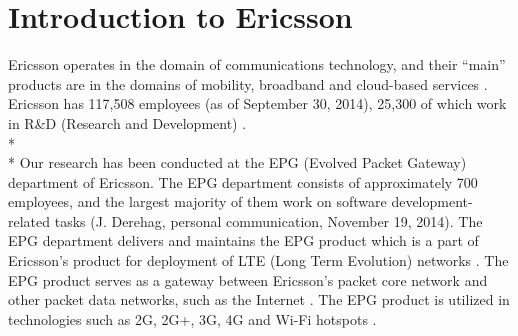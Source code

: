 \documentclass[final_report_innit.tex]{subfiles}
\begin{document}
\section{Introduction to Ericsson}
Ericsson operates in the domain of communications technology, and their “main” products are in the domains of mobility, broadband and cloud-based services \cite{etc, ecf}. Ericsson has 117,508 employees (as of September 30, 2014), 25,300 of which work in R\&D (Research and Development) \cite{etc}.
\\* 
\\* 
Our research has been conducted at the EPG (Evolved Packet Gateway) department of Ericsson. The EPG department consists of approximately 700 employees, and the largest majority of them work on software development-related tasks (J. Derehag, personal communication, November 19, 2014). The EPG department delivers and maintains the EPG product which is a part of Ericsson’s product for deployment of LTE (Long Term Evolution) networks \cite{eepg}. The EPG product serves as a gateway between Ericsson’s packet core network and other packet data networks, such as the Internet \cite{eepg}. The EPG product is utilized in technologies such as 2G, 2G+, 3G, 4G and Wi-Fi hotspots \cite{eepg}.
\end{document}
